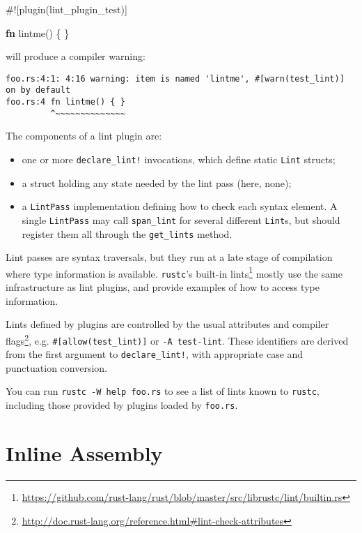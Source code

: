 \documentclass[a4paper,]{book}
\newenvironment{Shaded}{\begin{snugshade}}{\end{snugshade}}
\newcommand{\KeywordTok}[1]{\textcolor[rgb]{0.13,0.29,0.53}{\textbf{{#1}}}}
\newcommand{\AttributeTok}[1]{\textcolor[rgb]{0.77,0.63,0.00}{{#1}}}
\newcommand{\NormalTok}[1]{{#1}}
\renewcommand{\href}[2]{#2\footnote{\url{#1}}}
\begin{document}
\begin{Shaded}
\begin{Highlighting}[]
\AttributeTok{#![}\NormalTok{plugin}\AttributeTok{(}\NormalTok{lint_plugin_test}\AttributeTok{)]}

\KeywordTok{fn} \NormalTok{lintme() \{ \}}
\end{Highlighting}
\end{Shaded}

will produce a compiler warning:

\begin{verbatim}
foo.rs:4:1: 4:16 warning: item is named 'lintme', #[warn(test_lint)] on by default
foo.rs:4 fn lintme() { }
         ^~~~~~~~~~~~~~~
\end{verbatim}

The components of a lint plugin are:

\begin{itemize}
\item
  one or more \texttt{declare\_lint!} invocations, which define static
  \texttt{Lint} structs;
\item
  a struct holding any state needed by the lint pass (here, none);
\item
  a \texttt{LintPass} implementation defining how to check each syntax
  element. A single \texttt{LintPass} may call \texttt{span\_lint} for
  several different \texttt{Lint}s, but should register them all through
  the \texttt{get\_lints} method.
\end{itemize}

Lint passes are syntax traversals, but they run at a late stage of
compilation where type information is available. \texttt{rustc}'s
\href{https://github.com/rust-lang/rust/blob/master/src/librustc/lint/builtin.rs}{built-in
lints} mostly use the same infrastructure as lint plugins, and provide
examples of how to access type information.

Lints defined by plugins are controlled by the usual
\href{http://doc.rust-lang.org/reference.html\#lint-check-attributes}{attributes
and compiler flags}, e.g. \texttt{\#{[}allow(test\_lint){]}} or
\texttt{-A\ test-lint}. These identifiers are derived from the first
argument to \texttt{declare\_lint!}, with appropriate case and
punctuation conversion.

You can run \texttt{rustc\ -W\ help\ foo.rs} to see a list of lints
known to \texttt{rustc}, including those provided by plugins loaded by
\texttt{foo.rs}.

\section{Inline Assembly}\label{sec--inline-assembly}
\end{document}
